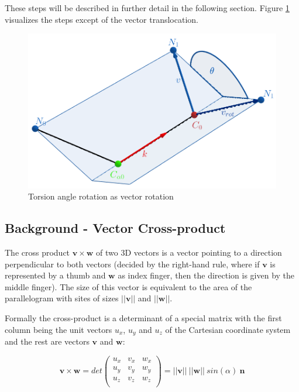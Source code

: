 These steps will be described in further detail in the following section. 
Figure \ref{fig:bond_rotation} visualizes the steps except of the vector translocation.

\begin{figure}
    \centering
    \includegraphics[width=\linewidth]{imgs_tomas/rodrigues_backbone.png}
    \caption{Torsion angle rotation as vector rotation}
    \label{fig:bond_rotation}
\end{figure}

\subsection{Background - Vector Cross-product}

The cross product $\bm{v} \times \bm{w}$ of two 3D vectors is a vector pointing to a direction perpendicular to both vectors (decided by the right-hand rule, where if $\bm{v}$  is represented by a thumb and $\bm{w}$ as index finger, then the direction is given by the middle finger). 
The size of this vector is equivalent to the area of the parallelogram with sites of sizes $||\bm{v}||$ and $||\bm{w}||$.

Formally the cross-product is a determinant of a special matrix with the first column being the unit vectors $u_x$, $u_y$ and $u_z$ of the Cartesian coordinate system and the rest are vectors $\bm{v}$ and $\bm{w}$:

$$\bm{v} \times \bm{w} = det
\left(
\begin{array}{ccc}
    u_x & v_{x} & w_{x}\\
    u_y & v_{y} & w_{y}\\
    u_z & v_{z} & w_{z}\\
\end{array}
\right) = ||\bm{v}||~||\bm{w}||~sin(\alpha)~\bm{n}
$$

